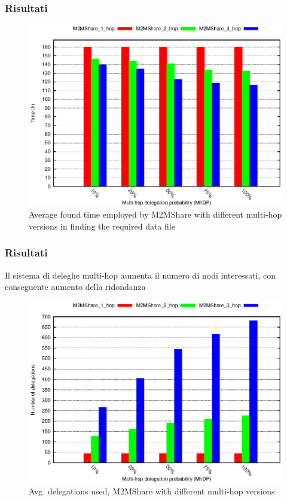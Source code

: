 \documentclass{beamer}
\begin{document}
\begin{frame}
\frametitle{Risultati}
\begin{center}
\begin{figure}[ht]
\includegraphics[scale=0.7]{tempiVF_MultiHop.eps}
\caption{Average found time employed by M2MShare with different multi-hop versions in finding the required data file}
\end{figure}
\end{center}
\end{frame}


\begin{frame}
\frametitle{Risultati}
Il sistema di deleghe multi-hop aumenta il numero di nodi interessati, con conseguente aumento della ridondanza
\begin{center}
\begin{figure}[ht]
\includegraphics[scale=0.55]{delegheMultiHopPerc.eps}
\caption{Avg. delegations used, M2MShare with different multi-hop versions}
\end{figure}
\end{center}
\end{frame}
\end{document}

